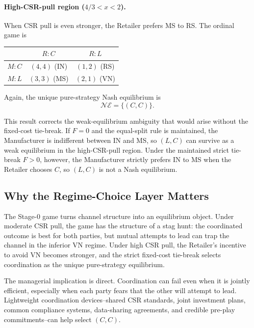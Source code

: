 \paragraph{High-CSR-pull region ($4/3<x<2$).}
When CSR pull is even stronger, the Retailer prefers MS to RS. The ordinal game is
\begin{center}
\renewcommand{\arraystretch}{1.2}
\begin{tabular}{c|cc}
 & $R:C$ & $R:L$\\ \hline
$M:C$ & $(4,4)$ (IN) & $(1,2)$ (RS)\\
$M:L$ & $(3,3)$ (MS) & $(2,1)$ (VN)\\
\end{tabular}
\end{center}
Again, the unique pure-strategy Nash equilibrium is
\begin{equation*}
    \mathcal{NE}=\{(C,C)\}.
\end{equation*}

This result corrects the weak-equilibrium ambiguity that would arise without the fixed-cost tie-break. If $F=0$ and the equal-split rule is maintained, the Manufacturer is indifferent between IN and MS, so $(L,C)$ can survive as a weak equilibrium in the high-CSR-pull region. Under the maintained strict tie-break $F>0$, however, the Manufacturer strictly prefers IN to MS when the Retailer chooses $C$, so $(L,C)$ is not a Nash equilibrium.

\subsection{Why the Regime-Choice Layer Matters}

The Stage-0 game turns channel structure into an equilibrium object. Under moderate CSR pull, the game has the structure of a stag hunt: the coordinated outcome is best for both parties, but mutual attempts to lead can trap the channel in the inferior VN regime. Under high CSR pull, the Retailer's incentive to avoid VN becomes stronger, and the strict fixed-cost tie-break selects coordination as the unique pure-strategy equilibrium.

The managerial implication is direct. Coordination can fail even when it is jointly efficient, especially when each party fears that the other will attempt to lead. Lightweight coordination devices--shared CSR standards, joint investment plans, common compliance systems, data-sharing agreements, and credible pre-play commitments--can help select $(C,C)$.

